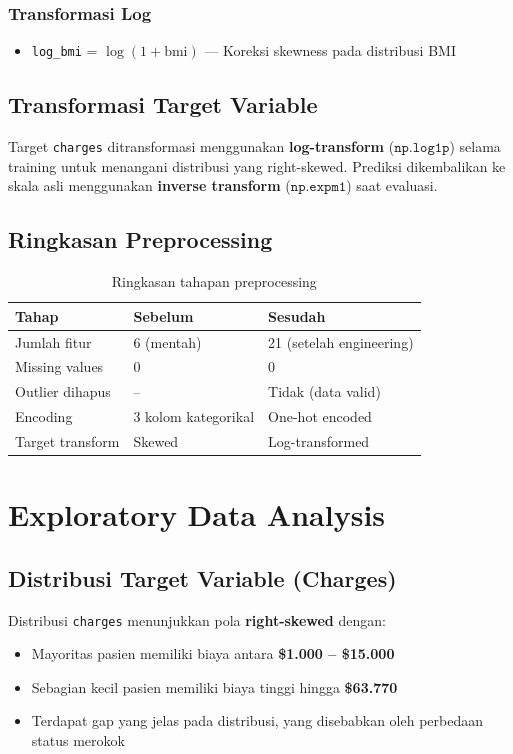 \documentclass[12pt,a4paper]{article}
\begin{document}
\subsubsection{Transformasi Log}
\begin{itemize}
    \item \texttt{log\_bmi} = $\log(1 + \text{bmi})$ — Koreksi skewness pada distribusi BMI
\end{itemize}

\subsection{Transformasi Target Variable}
Target \texttt{charges} ditransformasi menggunakan \textbf{log-transform} ($\texttt{np.log1p}$) selama training untuk menangani distribusi yang right-skewed.  Prediksi dikembalikan ke skala asli menggunakan \textbf{inverse transform} ($\texttt{np.expm1}$) saat evaluasi.

\subsection{Ringkasan Preprocessing}

\begin{table}[h!]
\centering
\caption{Ringkasan tahapan preprocessing}
\begin{tabular}{lll}
\toprule
\textbf{Tahap} & \textbf{Sebelum} & \textbf{Sesudah} \\
\midrule
Jumlah fitur       & 6 (mentah)         & 21 (setelah engineering) \\
Missing values      & 0                  & 0 \\
Outlier dihapus     & --                 & Tidak (data valid) \\
Encoding            & 3 kolom kategorikal & One-hot encoded \\
Target transform    & Skewed             & Log-transformed \\
\bottomrule
\end{tabular}
\end{table}


\section{Exploratory Data Analysis}

\subsection{Distribusi Target Variable (Charges)}
Distribusi \texttt{charges} menunjukkan pola \textbf{right-skewed} dengan:
\begin{itemize}
    \item Mayoritas pasien memiliki biaya antara \textbf{\$1.000 – \$15.000}
    \item Sebagian kecil pasien memiliki biaya tinggi hingga \textbf{\$63.770}
    \item Terdapat gap yang jelas pada distribusi, yang disebabkan oleh perbedaan status merokok
\end{itemize}
\end{document}
